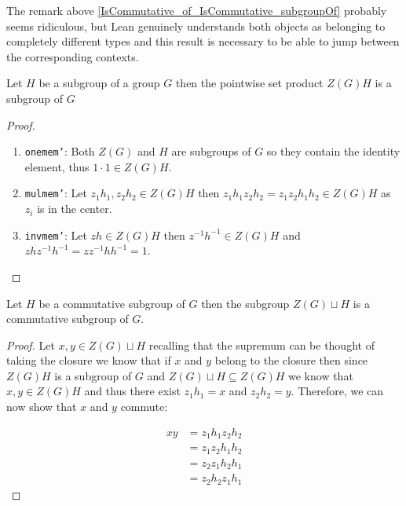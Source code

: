 \begin{remark}
  The remark above \ref{IsCommutative_of_IsCommutative_subgroupOf} probably seems ridiculous, but Lean genuinely understands both objects as belonging to completely different types and 
  this result is necessary to be able to jump between the corresponding contexts.
\end{remark}

\begin{definition}
  \label{center_mul}
  \leanok
  Let $H$ be a subgroup of a group $G$ then the pointwise set product $Z(G) H$ is a subgroup of $G$
\end{definition}
\begin{proof}
\begin{enumerate}
  \item \texttt{one\textunderscore mem'}: Both $Z(G)$ and $H$ are subgroups of $G$ so they contain the identity element, thus $1 \cdot 1 \in Z(G) H$.
  \item \texttt{mul\textunderscore mem'}: Let $z_1 h_1, z_2 h_2 \in Z(G) H$ then $z_1h_1z_2h_2 = z_1z_2 h_1h_2 \in Z(G) H$ as $z_i$ is in the center.
  \item \texttt{inv\textunderscore mem'}: Let $zh \in Z(G) H$ then $z^{-1} h^{-1} \in Z(G) H$ and $z h z^{-1} h^{-1} = zz^{-1}h h^{-1} = 1$.

\end{enumerate}
\end{proof}


\begin{lemma}
  \label{MaximalAbelianSubgroup.center_mul_subset_center_mul}
  \leanok
\end{lemma}

\begin{lemma}
  \label{IsComm_of_center_join_IsComm}
  \leanok

  Let $H$ be a commutative subgroup of $G$ then the subgroup $Z(G) \sqcup H$  is a commutative subgroup of $G$.
\end{lemma}
\begin{proof}
  Let $x, y \in Z(G) \sqcup H$ recalling that the supremum can be thought of taking the closure
  we know that if $x$ and $y$ belong to the closure then since $Z(G) H$ is a subgroup of $G$ and $Z(G) \sqcup H \subseteq Z(G) H$
  we know that $x, y \in Z(G) H$ and thus there exist $z_1 h_1 = x$ and $z_2 h_2 = y$. Therefore, we can now show that $x$ and $y$ commute:

  \begin{align*}
  x y &= z_1 h_1 z_2 h_2\\
  & = z_1 z_2 h_1 h_2 \tag{as $z_2$ is in the center}\\
  &= z_2 z_1 h_2 h_1 \tag{as $H$ is a commutative subgroup}\\
  &= z_2 h_2 z_1 h_1 \tag{as $z_1$ is in the center}
  \end{align*}
\end{proof}

